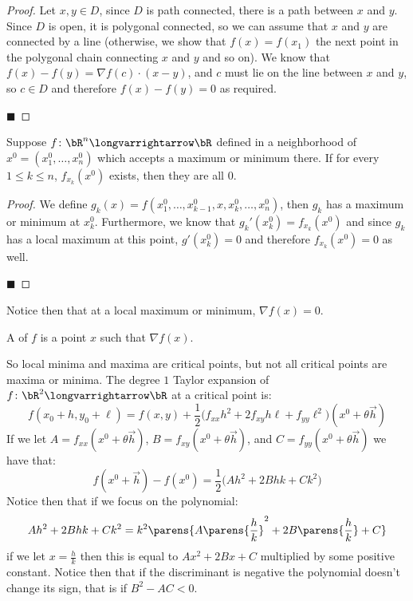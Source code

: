 \documentclass[10pt]{article}
\begin{document}
\begin{proof}

    Let $x,y\in D$, since $D$ is path connected, there is a path between $x$ and $y$.
    Since $D$ is open, it is polygonal connected, so we can assume that $x$ and $y$ are connected by a line (otherwise, we show that $f(x)=f(x_1)$ the next point in the polygonal chain connecting $x$ and $y$
    and so on).
    We know that $f(x)-f(y)=\nabla f(c)\cdot(x-y)$, and $c$ must lie on the line between $x$ and $y$, so $c\in D$ and therefore $f(x)-f(y)=0$ as required.

    \hfill$\blacksquare$

\end{proof}

\newpage
\begin{thrm*}

    Suppose $f\colon\bR^n\longvarrightarrow\bR$ defined in a neighborhood of $x^0=(x^0_1,\dots,x^0_n)$ which accepts a maximum or minimum there.
    If for every $1\leq k\leq n$, $f_{x_k}(x^0)$ exists, then they are all $0$.

\end{thrm*}

\begin{proof}

    We define $g_k(x)=f(x^0_1,\dots,x^0_{k-1},x,x^0_k,\dots,x^0_n)$, then $g_k$ has a maximum or minimum at $x^0_k$.
    Furthermore, we know that $g_k'(x^0_k)=f_{x_k}(x^0)$ and since $g_k$ has a local maximum at this point, $g'(x_k^0)=0$ and therefore $f_{x_k}(x^0)=0$ as well.

    \hfill$\blacksquare$

\end{proof}

Notice then that at a local maximum or minimum, $\nabla f(x)=0$.

\begin{defn*}

    A  of $f$ is a point $x$ such that $\nabla f(x)$.

\end{defn*}

So local minima and maxima are critical points, but not all critical points are maxima or minima.
The degree $1$ Taylor expansion of $f\colon\bR^2\longvarrightarrow\bR$ at a critical point is:
\[ f(x_0+h, y_0+\ell) = f(x, y) + \frac12\bigl(f_{xx}h^2+2f_{xy}h\ell+f_{yy}\ell^2\bigr)(x^0+\theta\vec h) \]
If we let $A=f_{xx}(x^0+\theta\vec h)$, $B=f_{xy}(x^0+\theta\vec h)$, and $C=f_{yy}(x^0+\theta\vec h)$ we have that:
\[ f(x^0+\vec h) - f(x^0) = \frac12\bigl(Ah^2+2Bhk+Ck^2\bigr) \]
Notice then that if we focus on the polynomial:
\[ Ah^2 + 2Bhk + Ck^2 = k^2\parens{A\parens{\frac hk}^2+2B\parens{\frac hk}+C} \]
if we let $x=\frac hk$ then this is equal to $Ax^2+2Bx+C$ multiplied by some positive constant.
Notice then that if the discriminant is negative the polynomial doesn't change its sign, that is if $B^2-AC<0$.
\end{document}
